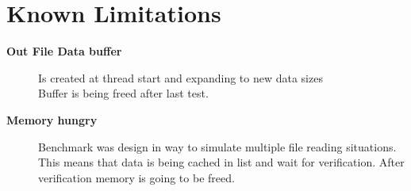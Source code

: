 \hypertarget{KnownIssues}{
\section{Known Limitations}
\label{KnownLimitations}
}

\begin{description}
\item [\textbf{Out File Data buffer}] Is created at thread start and expanding to new data sizes\\ Buffer is being freed after last test.
\item [\textbf{Memory hungry} ] Benchmark was design in way to simulate multiple file reading situations.\\
This means that data is being cached in list and wait for verification. After verification memory is going to be freed.
\end{description}